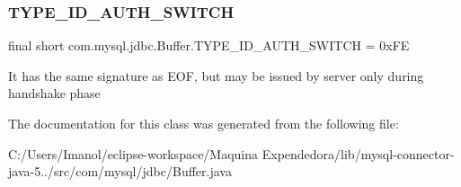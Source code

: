 \subsubsection{\texorpdfstring{T\+Y\+P\+E\+\_\+\+I\+D\+\_\+\+A\+U\+T\+H\+\_\+\+S\+W\+I\+T\+CH}{TYPE\_ID\_AUTH\_SWITCH}}
{\footnotesize\ttfamily final short com.\+mysql.\+jdbc.\+Buffer.\+T\+Y\+P\+E\+\_\+\+I\+D\+\_\+\+A\+U\+T\+H\+\_\+\+S\+W\+I\+T\+CH = 0x\+FE\hspace{0.3cm}{\ttfamily [static]}}

It has the same signature as E\+OF, but may be issued by server only during handshake phase 

The documentation for this class was generated from the following file\+:\begin{DoxyCompactItemize}
\item 
C\+:/\+Users/\+Imanol/eclipse-\/workspace/\+Maquina Expendedora/lib/mysql-\/connector-\/java-\/5../src/com/mysql/jdbc/Buffer.\+java\end{DoxyCompactItemize}
